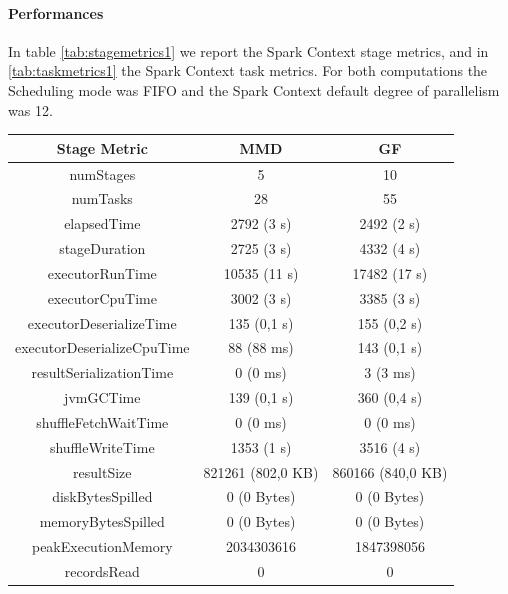 \documentclass[a4paper,11pt, twoside]{article}
\begin{document}
            \paragraph{Performances}
            In table \ref{tab:stagemetrics1} we report the Spark Context stage metrics, and in \ref{tab:taskmetrics1} the Spark Context task metrics. For both computations the Scheduling mode was FIFO and the Spark Context default degree of parallelism was 12.
            \begin{table}[h!]
                    \centering
            	\small
            	\begin{tabular}{ccc}
            		\toprule
            		  \textbf{Stage Metric} & \textbf{MMD} & \textbf{GF} \\
            		\midrule
            		numStages & 5 & 10 \\
                        numTasks & 28 & 55 \\
                        elapsedTime & 2792 (3 s) & 2492 (2 s) \\
                        stageDuration & 2725 (3 s) & 4332 (4 s) \\
                        executorRunTime & 10535 (11 s) & 17482 (17 s) \\
                        executorCpuTime & 3002 (3 s) & 3385 (3 s) \\
                        executorDeserializeTime & 135 (0,1 s) & 155 (0,2 s) \\
                        executorDeserializeCpuTime & 88 (88 ms) & 143 (0,1 s) \\
                        resultSerializationTime & 0 (0 ms) & 3 (3 ms) \\
                        jvmGCTime & 139 (0,1 s) & 360 (0,4 s) \\
                        shuffleFetchWaitTime & 0 (0 ms) & 0 (0 ms) \\
                        shuffleWriteTime & 1353 (1 s) & 3516 (4 s) \\
                        resultSize & 821261 (802,0 KB) & 860166 (840,0 KB) \\
                        diskBytesSpilled & 0 (0 Bytes) & 0 (0 Bytes) \\
                        memoryBytesSpilled & 0 (0 Bytes) & 0 (0 Bytes) \\
                        peakExecutionMemory & 2034303616 & 1847398056 \\
                        recordsRead & 0 & 0 \\

\end{tabular}
\end{table}
\end{document}

